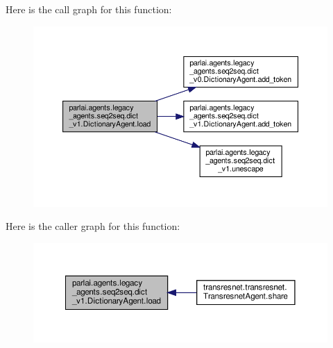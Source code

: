 Here is the call graph for this function\+:
\nopagebreak
\begin{figure}[H]
\begin{center}
\leavevmode
\includegraphics[width=350pt]{classparlai_1_1agents_1_1legacy__agents_1_1seq2seq_1_1dict__v1_1_1DictionaryAgent_aee99d2e98af6ca938e44daa87d3bee9c_cgraph}
\end{center}
\end{figure}
Here is the caller graph for this function\+:
\nopagebreak
\begin{figure}[H]
\begin{center}
\leavevmode
\includegraphics[width=350pt]{classparlai_1_1agents_1_1legacy__agents_1_1seq2seq_1_1dict__v1_1_1DictionaryAgent_aee99d2e98af6ca938e44daa87d3bee9c_icgraph}
\end{center}
\end{figure}
\mbox{\label{classparlai_1_1agents_1_1legacy__agents_1_1seq2seq_1_1dict__v1_1_1DictionaryAgent_a401e9c33a2b503efb53ec0c6cedc2f8e}} 
